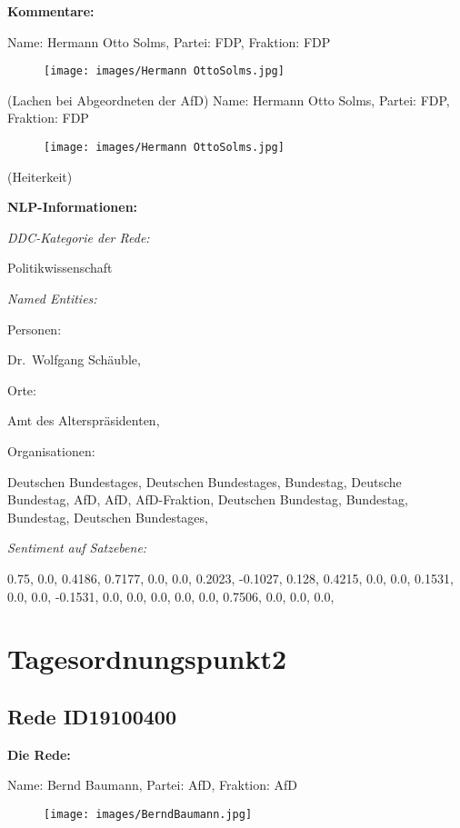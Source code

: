 \documentclass[10pt, a4paper]{report}
\begin{document}
\textbf{Kommentare:}

Name: Hermann Otto Solms, Partei: FDP, Fraktion: FDP

\begin{figure}[!ht]
\texttt{[image: images/Hermann OttoSolms.jpg]}
\end{figure}


(Lachen bei Abgeordneten der AfD)
Name: Hermann Otto Solms, Partei: FDP, Fraktion: FDP

\begin{figure}[!ht]
\texttt{[image: images/Hermann OttoSolms.jpg]}
\end{figure}


(Heiterkeit)


\textbf{NLP-Informationen:}

\textit{DDC-Kategorie der Rede:}

Politikwissenschaft

\textit{Named Entities:}

Personen:

Dr. Wolfgang Schäuble, 

Orte:

Amt des Alterspräsidenten, 

Organisationen:

Deutschen Bundestages, Deutschen Bundestages, Bundestag, Deutsche Bundestag, AfD, AfD, AfD-Fraktion, Deutschen Bundestag, Bundestag, Bundestag, Deutschen Bundestages, 

\textit{Sentiment auf Satzebene:}

0.75, 0.0, 0.4186, 0.7177, 0.0, 0.0, 0.2023, -0.1027, 0.128, 0.4215, 0.0, 0.0, 0.1531, 0.0, 0.0, -0.1531, 0.0, 0.0, 0.0, 0.0, 0.0, 0.7506, 0.0, 0.0, 0.0, 
\section{Tagesordnungspunkt2}
\subsection{Rede ID19100400}

\textbf{Die Rede:}

Name: Bernd Baumann, Partei: AfD, Fraktion: AfD

\begin{figure}[!ht]
\texttt{[image: images/BerndBaumann.jpg]}
\end{figure}
\end{document}
